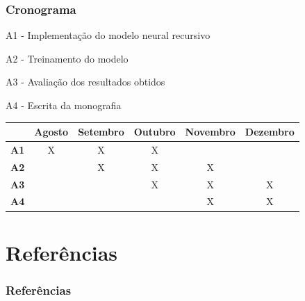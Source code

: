 \documentclass[10pt]{beamer}
\begin{document}
\begin{frame}[fragile]
  \frametitle{Cronograma}

  A1 - Implementação do modelo neural recursivo

  A2 - Treinamento do modelo

  A3 - Avaliação dos resultados obtidos

  A4 - Escrita da monografia

  \begin{table}[!htb]
  \footnotesize
  \centering
  \begin{tabular}{cccccc}
    \toprule
    & \textbf{Agosto} & \textbf{Setembro}  & \textbf{Outubro}  & \textbf{Novembro} & \textbf{Dezembro}  \\
    \midrule
    \textbf{A1} & X & X & X &   &   \\
    \textbf{A2} &   & X & X & X &   \\
    \textbf{A3} &   &   & X & X & X \\
    \textbf{A4} &   &   &   & X & X \\
    \bottomrule
  \end{tabular}
  \end{table}



\end{frame}



\section{Referências}

\begin{frame}

  \frametitle{Referências}
  

\end{frame}




\end{document}
